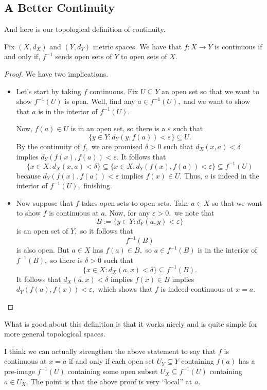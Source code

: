 \documentclass[../notes.tex]{subfiles}
\begin{document}
\subsection{A Better Continuity}
And here is our topological definition of continuity.
\begin{theorem}
	Fix $(X,d_X)$ and $(Y,d_Y)$ metric spaces. We have that $f:X\to Y$ is continuous if and only if, $f^{-1}$ sends open sets of $Y$ to open sets of $X.$
\end{theorem}
\begin{proof}
	We have two implications.
	\begin{itemize}
		\item Let's start by taking $f$ continuous. Fix $U\subseteq Y$ an open set so that we want to show $f^{-1}(U)$ is open. Well, find any $a\in f^{-1}(U),$ and we want to show that $a$ is in the interior of $f^{-1}(U).$

		Now, $f(a)\in U$ is in an open set, so there is a $\varepsilon$ such that
		\[\{y\in Y:d_Y(y,f(a))<\varepsilon\}\subseteq U.\]
		By the continuity of $f,$ we are promised $\delta>0$ such that $d_X(x,a)<\delta$ implies $d_Y(f(x),f(a))<\varepsilon.$ It follows that
		\[\{x\in X:d_X(x,a)<\delta\}\subseteq\{x\in X:d_Y(f(x),f(a))<\varepsilon\}\subseteq f^{-1}(U)\]
		because $d_Y(f(x),f(a))<\varepsilon$ implies $f(x)\in U.$ Thus, $a$ is indeed in the interior of $f^{-1}(U),$ finishing.
		\item Now suppose that $f$ takes open sets to open sets. Take $a\in X$ so that we want to show $f$ is continuous at $a.$ Now, for any $\varepsilon>0,$ we note that
		\[B:=\{y\in Y:d_Y(a,y)<\varepsilon\}\]
		is an open set of $Y,$ so it follows that
		\[f^{-1}(B)\]
		is also open. But $a\in X$ has $f(a)\in B,$ so $a\in f^{-1}(B)$ is in the interior of $f^{-1}(B),$ so there is $\delta>0$ such that
		\[\{x\in X:d_X(a,x)<\delta\}\subseteq f^{-1}(B).\]
		It follows that $d_X(a,x)<\delta$ implies $f(x)\in B$ implies $d_Y(f(a),f(x))<\varepsilon,$ which shows that $f$ is indeed continuous at $x=a.$
		\qedhere
	\end{itemize}
\end{proof}
\begin{remark}
	What is good about this definition is that it works nicely and is quite simple for more general topological spaces.
\end{remark}
\begin{remark}
	I think we can actually strengthen the above statement to say that $f$ is continuous at $x=a$ if and only if each open set $U_Y\subseteq Y$ containing $f(a)$ has a pre-image $f^{-1}(U)$ containing some open subset $U_X\subseteq f^{-1}(U)$ containing $a\in U_X.$ The point is that the above proof is very ``local'' at $a.$
\end{remark}
\end{document}
